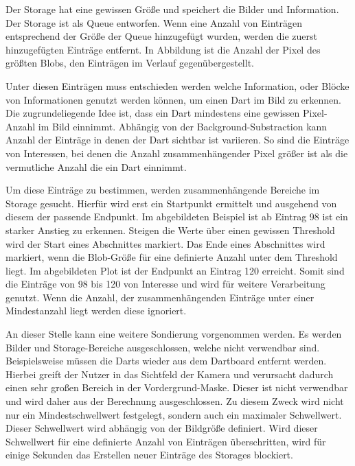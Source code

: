 Der Storage hat eine gewissen Größe und speichert die Bilder und Information. Der Storage ist als Queue entworfen. Wenn eine Anzahl von Einträgen entsprechend der Größe der Queue hinzugefügt wurden, werden die zuerst hinzugefügten Einträge entfernt. In Abbildung  ist die Anzahl der Pixel des größten Blobs, den Einträgen im Verlauf gegenübergestellt.

Unter diesen Einträgen muss entschieden werden welche Information, oder Blöcke von Informationen genutzt werden können, um einen Dart im Bild zu erkennen. Die zugrundeliegende Idee ist, dass ein Dart mindestens eine gewissen Pixel-Anzahl im Bild einnimmt. Abhängig von der Background-Substraction kann Anzahl der Einträge in denen der Dart sichtbar ist variieren. So sind die Einträge von Interessen, bei denen die Anzahl zusammenhängender Pixel größer ist als die vermutliche Anzahl die ein Dart einnimmt.

Um diese Einträge zu bestimmen, werden zusammenhängende Bereiche im Storage gesucht. Hierfür wird erst ein Startpunkt ermittelt und ausgehend von diesem der passende Endpunkt.
Im abgebildeten Beispiel ist ab Eintrag 98 ist ein starker Anstieg zu erkennen. Steigen die Werte über einen gewissen Threshold wird der Start eines Abschnittes markiert. Das Ende eines Abschnittes wird markiert, wenn die Blob-Größe für eine definierte Anzahl unter dem Threshold liegt. Im abgebildeten Plot ist der Endpunkt an Eintrag 120 erreicht. Somit sind die Einträge von 98 bis 120 von Interesse und wird für weitere Verarbeitung genutzt. 
Wenn die Anzahl, der zusammenhängenden Einträge unter einer Mindestanzahl liegt werden diese ignoriert.

An dieser Stelle kann eine weitere Sondierung vorgenommen werden. Es werden Bilder und Storage-Bereiche ausgeschlossen, welche nicht verwendbar sind.
Beispielsweise müssen die Darts wieder aus dem Dartboard entfernt werden. Hierbei greift der Nutzer in das Sichtfeld der Kamera und verursacht dadurch einen sehr großen Bereich in der Vordergrund-Maske. Dieser ist nicht verwendbar und wird daher aus der Berechnung ausgeschlossen. Zu diesem Zweck wird nicht nur ein Mindestschwellwert festgelegt, sondern auch ein maximaler Schwellwert. Dieser Schwellwert wird abhängig von der Bildgröße definiert. Wird dieser Schwellwert für eine definierte Anzahl von Einträgen überschritten, wird für einige Sekunden das Erstellen neuer Einträge des Storages blockiert.

